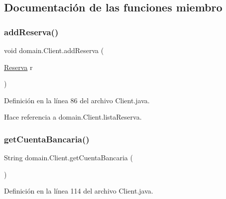 \subsection{Documentación de las funciones miembro}
\mbox{\label{classdomain_1_1_client_aca417158adc1bb7fafe02b8f54265edf}} 
\subsubsection{\texorpdfstring{addReserva()}{addReserva()}}
{\footnotesize\ttfamily void domain.\+Client.\+add\+Reserva (\begin{DoxyParamCaption}\item[{\mbox{\hyperlink{classdomain_1_1_reserva}{Reserva}}}]{r }\end{DoxyParamCaption})}



Definición en la línea 86 del archivo Client.\+java.


\begin{DoxyCode}{0}

\end{DoxyCode}


Hace referencia a domain.\+Client.\+lista\+Reserva.

\mbox{\label{classdomain_1_1_client_adeb2b614c2e27afd7e1c1f50ba0a561f}} 
\subsubsection{\texorpdfstring{getCuentaBancaria()}{getCuentaBancaria()}}
{\footnotesize\ttfamily String domain.\+Client.\+get\+Cuenta\+Bancaria (\begin{DoxyParamCaption}{ }\end{DoxyParamCaption})}



Definición en la línea 114 del archivo Client.\+java.


\begin{DoxyCode}{0}

\end{DoxyCode}


